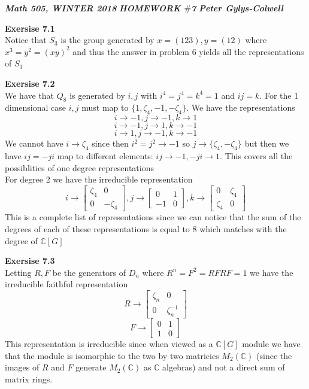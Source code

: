 \documentclass[12pt]{article}
\newenvironment{ques}[1]{\textbf{Exersise #1}\vspace{1 mm}\\ }{\bigskip}
\theoremstyle{definition}
\newcommand{\C}{\mathbb C}
\begin{document}
\noindent \textit{\textbf{Math 505, WINTER 2018}} \hspace{1.3cm}
\textit{\textbf{HOMEWORK $\#$7}} \hspace{1.3cm} \textit{\textbf{Peter
Gylys-Colwell}} 

\vspace{1cm}

\begin{ques}{7.1}
	Notice that $S_3$ is the group generated by $x = (123), y = (12)$ where $x^3
	= y^2 = (xy)^2$ and thus the answer in problem $6$ yields all the
	representations of $S_3$
\end{ques}

\begin{ques}{7.2}
	We have that $Q_8$ is generated by $i,j$ with $i^4 = j^4 = k^4 = 1$ and $ij = k$.
	For the 1 dimensional case $i, j$ must map to $\{1, \zeta_4, -1,
	-\zeta_4\}$. We have the representations
	$$i \to -1, j \to -1, k \to 1$$
	$$i \to -1, j \to 1, k \to -1$$
	$$i \to 1, j \to -1, k \to -1$$
	We cannot have $i \to \zeta_4$
	since then $i^2 = j^2 \to -1$ so $j \to
	\{\zeta_4, -\zeta_4 \}$ but then we have $ij = -ji$ map to different
	elements: $ij \to -1, -ji \to 1$. This covers all the possiblities of one
	degree representations \\
	For degree 2 we have the irreducible representation
	$$i \to
	\begin{bmatrix}
	\zeta_4 & 0\\
	0 & -\zeta_4
	\end{bmatrix}, 
	j \to 
	\begin{bmatrix}
	0 & 1\\
	-1 & 0
	\end{bmatrix},
	k \to 
	\begin{bmatrix}
	0 & \zeta_4\\
	\zeta_4 & 0
	\end{bmatrix}
	$$
	This is a complete list of representations since we can notice that the sum
	of the degrees of each of these representations is equal to $8$ which
	matches with the degree of $\C[G]$
\end{ques}

\begin{ques}{7.3}
	Letting $R,F$ be the generators of $D_n$ where $R^n = F^2 = RFRF = 1$ we
	have the irreducible faithful representation
	$$R \to 
	\begin{bmatrix}
	\zeta_n & 0\\
	0 & \zeta_n^{-1}
	\end{bmatrix}$$
	$$F \to 
	\begin{bmatrix}
	0 & 1\\
	1 & 0
	\end{bmatrix}$$
	This representation is irreducible since when viewed as a $\C[G]$ module we
	have that the module is isomorphic to the two by two matricies $M_2(\C)$
	(since the images of $R$ and $F$ generate $M_2(\C)$ as $\C$ algebras)
	and not a direct sum of matrix rings. 
\end{ques}
\end{document}
